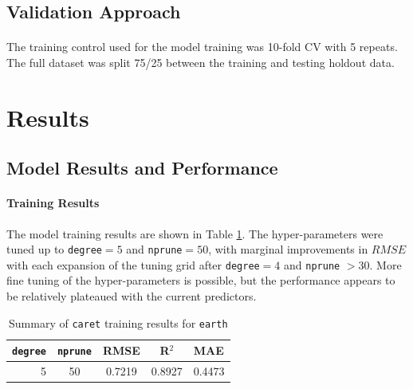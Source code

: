 \documentclass[11 pt]{article}  %
\begin{document}
\subsection{Validation Approach}
\paragraph{} The training control used for the model training was 10-fold CV with
5 repeats. The full dataset was split 75/25 between the training and testing 
holdout data.

\pagebreak
\section{Results}

\subsection{Model Results and Performance}

\paragraph{Training Results} The model training results are shown in Table \ref{mars-summary}. 
The hyper-parameters were tuned up to \texttt{degree}$=5$ and \texttt{nprune}$=50$, 
with marginal improvements in $RMSE$ with each expansion of the tuning grid after
\texttt{degree}$=4$ and \texttt{nprune} $ > 30$. More fine tuning of the 
hyper-parameters is possible, but the performance appears to be relatively plateaued
with the current predictors.

\begin{table}[h!tb]
    \centering
    \begin{tabular}{rcccl}
        \textbf{\texttt{degree}} & \textbf{\texttt{nprune}} & \textbf{RMSE} & \textbf{R$^2$} & \textbf{MAE}\\ \hline\hline
        5                        & 50                       & 0.7219        & 0.8927         & 0.4473
    \end{tabular}
    \caption{Summary of \texttt{caret} training results for \texttt{earth}}
    \label{mars-summary}
\end{table}
\end{document}

